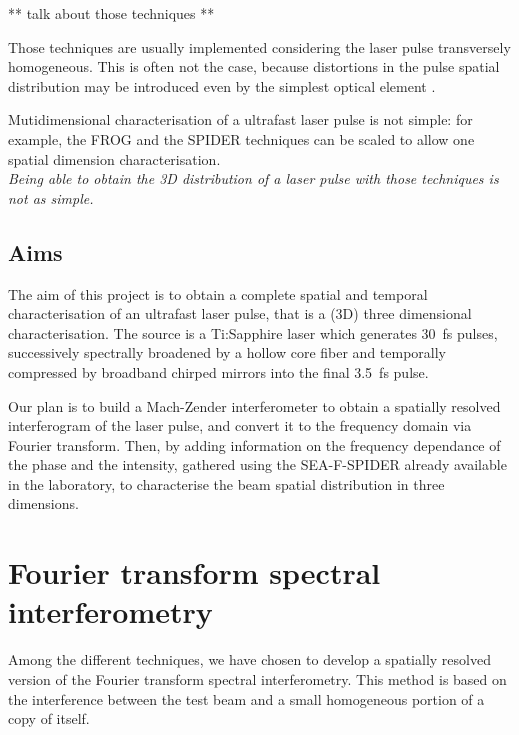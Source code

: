 \documentclass[12pt,a4paper,twoside]{article}
\begin{document}
** talk about those techniques **

Those techniques are usually implemented considering the laser pulse transversely homogeneous.
This is often not the case, because distortions in the pulse spatial distribution may be introduced even by the simplest optical element \cite{bor}.

Mutidimensional characterisation of a ultrafast laser pulse is not simple: for example, the FROG and the SPIDER techniques can be scaled to allow one spatial dimension characterisation.\\
\textit{Being able to obtain the 3D distribution of a laser pulse with those techniques is not as simple.}

\subsection{Aims}

The aim of this project is to obtain a complete spatial and temporal characterisation of an ultrafast laser pulse, that is a (3D) three dimensional characterisation.
The source is a Ti:Sapphire laser which generates \SI{30}{\fs} pulses, successively spectrally broadened by a hollow core fiber and temporally compressed by broadband chirped mirrors into the final \SI{3.5}{\fs} pulse.

Our plan is to build a Mach-Zender interferometer to obtain a spatially resolved interferogram of the laser pulse, and convert it to the frequency domain via Fourier transform.
Then, by adding information on the frequency dependance of the phase and the intensity, gathered using the SEA-F-SPIDER already available in the laboratory, to characterise the beam spatial distribution in three dimensions.

\section{Fourier transform spectral interferometry}
Among the different techniques, we have chosen to develop a spatially resolved version of the Fourier transform spectral interferometry.
This method is based on the interference between the test beam and a small homogeneous portion of a copy of itself.
\end{document}
